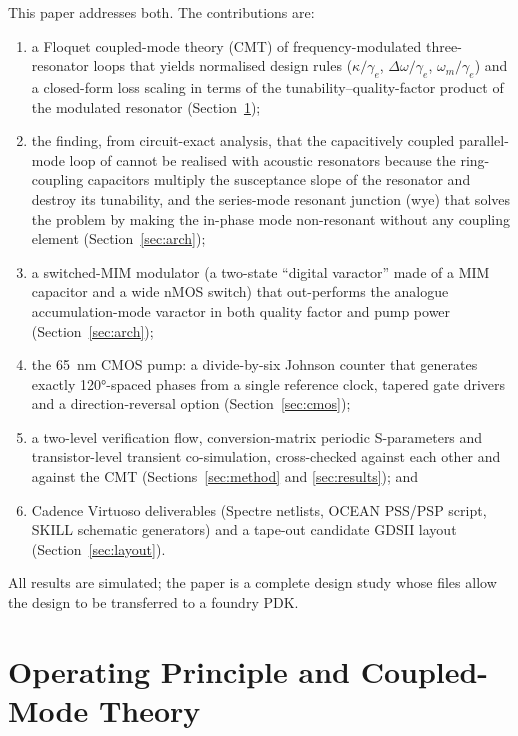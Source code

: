 \documentclass[journal]{IEEEtran}
\begin{document}
This paper addresses both. The contributions are:
\begin{enumerate}
\item a Floquet coupled-mode theory (CMT) of frequency-modulated three-resonator loops that yields normalised design rules ($\kappa/\gamma_e$, $\Delta\omega/\gamma_e$, $\omega_m/\gamma_e$) and a closed-form loss scaling in terms of the tunability--quality-factor product of the modulated resonator (Section~\ref{sec:theory});
\item the finding, from circuit-exact analysis, that the capacitively coupled parallel-mode loop of \cite{estep2014magnetic} cannot be realised with acoustic resonators because the ring-coupling capacitors multiply the susceptance slope of the resonator and destroy its tunability, and the series-mode resonant junction (wye) that solves the problem by making the in-phase mode non-resonant without any coupling element (Section~\ref{sec:arch});
\item a switched-MIM modulator (a two-state ``digital varactor'' made of a MIM capacitor and a wide nMOS switch) that out-performs the analogue accumulation-mode varactor in both quality factor and pump power (Section~\ref{sec:arch});
\item the \SI{65}{nm} CMOS pump: a divide-by-six Johnson counter that generates exactly \ang{120}-spaced phases from a single reference clock, tapered gate drivers and a direction-reversal option (Section~\ref{sec:cmos});
\item a two-level verification flow, conversion-matrix periodic S-parameters and transistor-level transient co-simulation, cross-checked against each other and against the CMT (Sections~\ref{sec:method} and \ref{sec:results}); and
\item Cadence Virtuoso deliverables (Spectre netlists, OCEAN PSS/PSP script, SKILL schematic generators) and a tape-out candidate GDSII layout (Section~\ref{sec:layout}).
\end{enumerate}
All results are simulated; the paper is a complete design study whose files allow the design to be transferred to a foundry PDK.

\section{Operating Principle and Coupled-Mode Theory}\label{sec:theory}
\end{document}
